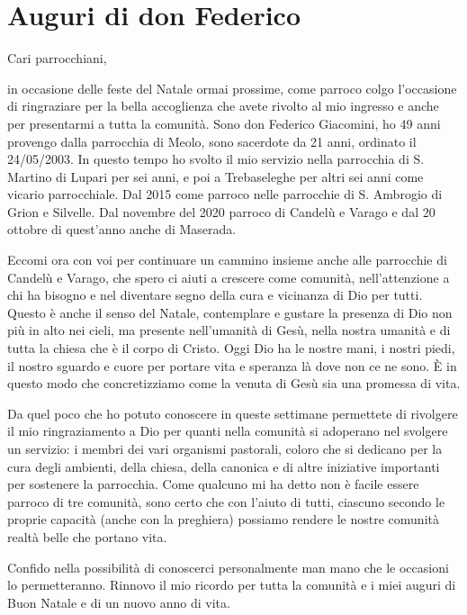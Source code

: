 \section{Auguri di don Federico}

Cari parrocchiani,

in occasione delle feste del Natale ormai prossime, come parroco colgo l'occasione di ringraziare per la bella accoglienza che avete rivolto al mio ingresso e anche per presentarmi a tutta la comunità. Sono don Federico Giacomini, ho 49 anni provengo dalla parrocchia di Meolo, sono sacerdote da 21 anni, ordinato il 24/05/2003. In questo tempo ho svolto il mio servizio nella parrocchia di S. Martino di Lupari per sei anni, e poi a Trebaseleghe per altri sei anni come vicario parrocchiale. Dal 2015 come parroco nelle parrocchie di S. Ambrogio di Grion e Silvelle. Dal novembre del 2020 parroco di Candelù e Varago e dal 20 ottobre di quest'anno anche di Maserada.

Eccomi ora con voi per continuare un cammino insieme anche alle parrocchie di Candelù e Varago, che spero ci aiuti a crescere come comunità, nell'attenzione a chi ha bisogno e nel diventare segno della cura e vicinanza di Dio per tutti. Questo è anche il senso del Natale, contemplare e gustare la presenza di Dio non più in alto nei cieli, ma presente nell'umanità di Gesù, nella nostra umanità e di tutta la chiesa che è il corpo di Cristo. Oggi Dio ha le nostre mani, i nostri piedi, il nostro sguardo e cuore per portare vita e speranza là dove non ce ne sono. È in questo modo che concretizziamo come la venuta di Gesù sia una promessa di vita.

Da quel poco che ho potuto conoscere in queste settimane permettete di rivolgere il mio ringraziamento a Dio per quanti nella comunità si adoperano nel svolgere un servizio: i membri dei vari organismi pastorali, coloro che si dedicano per la cura degli ambienti, della chiesa, della canonica e di altre iniziative importanti per sostenere la parrocchia. Come qualcuno mi ha detto non è facile essere parroco di tre comunità, sono certo che con l'aiuto di tutti, ciascuno secondo le proprie capacità (anche con la preghiera) possiamo rendere le nostre comunità realtà belle che portano vita.

Confido nella possibilità di conoscerci personalmente man mano che le occasioni lo permetteranno. Rinnovo il mio ricordo per tutta la comunità e i miei auguri di Buon Natale e di un nuovo anno di vita.

